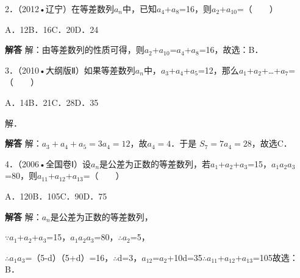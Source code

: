 2．（2012•辽宁）在等差数列{\ensuremath{a_{n}}}中，已知\ensuremath{a_{4}}+\ensuremath{a_{8}}=16，则\ensuremath{a_{2}}+\ensuremath{a_{10}}=（　　）\par
\qquad{}\qquad{}\qquad{}A．12\qquad{}B．16\qquad{}C．20\qquad{}D．24\qquad{}\par
\QuestionSpace{1.2cm}
\ifshowanswers
\par\begingroup\color{solutioncolor}\noindent\textbf{解答}\quad
解：由等差数列的性质可得，则\ensuremath{a_{2}}+\ensuremath{a_{10}}=\ensuremath{a_{4}}+\ensuremath{a_{8}}=16，故选：B．\par
\par\endgroup\fi

3．（2010•大纲版Ⅱ）如果等差数列{\ensuremath{a_{n}}}中，\ensuremath{a_{3}}+\ensuremath{a_{4}}+\ensuremath{a_{5}}=12，那么\ensuremath{a_{1}}+\ensuremath{a_{2}}+\ldots{}+\ensuremath{a_{7}}=（　　）\par
\qquad{}\qquad{}\qquad{}A．14\qquad{}B．21\qquad{}C．28\qquad{}D．35\qquad{}\par
解．\par
\QuestionSpace{1.2cm}
\ifshowanswers
\par\begingroup\color{solutioncolor}\noindent\textbf{解答}\quad
解：$a_3+a_4+a_5=3a_4=12$，故$a_4=4$．于是
$S_7=7a_4=28$，故选C．\par
\par\endgroup\fi

4．（2006•全国卷Ⅰ）设{\ensuremath{a_{n}}}是公差为正数的等差数列，若\ensuremath{a_{1}}+\ensuremath{a_{2}}+\ensuremath{a_{3}}=15，\ensuremath{a_{1}}\ensuremath{a_{2}}\ensuremath{a_{3}}=80，则\ensuremath{a_{11}}+\ensuremath{a_{12}}+\ensuremath{a_{13}}=（　　）\par
\qquad{}\qquad{}\qquad{}A．120\qquad{}B．105\qquad{}C．90\qquad{}D．75\qquad{}\par
\QuestionSpace{1.2cm}
\ifshowanswers
\par\begingroup\color{solutioncolor}\noindent\textbf{解答}\quad
解：{\ensuremath{a_{n}}}是公差为正数的等差数列，\par
\ensuremath{\because}\ensuremath{a_{1}}+\ensuremath{a_{2}}+\ensuremath{a_{3}}=15，\ensuremath{a_{1}}\ensuremath{a_{2}}\ensuremath{a_{3}}=80，\ensuremath{\therefore}\ensuremath{a_{2}}=5，\par
\ensuremath{\therefore}\ensuremath{a_{1}}\ensuremath{a_{3}}=（5-d）（5+d）=16，\ensuremath{\therefore}d=3，\ensuremath{a_{12}}=\ensuremath{a_{2}}+10d=35\ensuremath{\therefore}\ensuremath{a_{11}}+\ensuremath{a_{12}}+\ensuremath{a_{13}}=105故选：B．\par
\par\endgroup\fi

